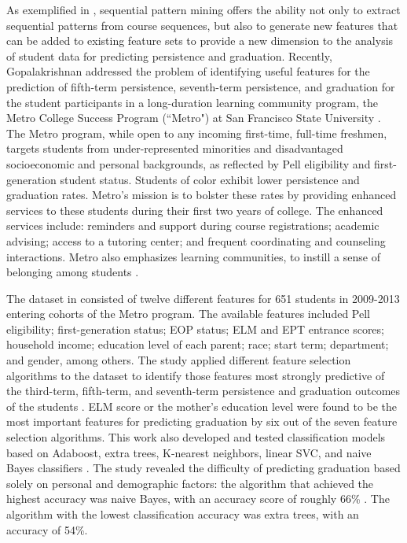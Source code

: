 As exemplified in \cite{Campagni}, sequential pattern mining offers the ability not only to extract sequential patterns from course sequences, but also to generate new features that can be added to existing feature sets to provide a new dimension to the analysis of student data for predicting persistence and graduation.  Recently, Gopalakrishnan \cite{Gopalakrishnan} addressed the problem of identifying useful features for the prediction of fifth-term persistence, seventh-term persistence, and graduation for the student participants in a long-duration learning community program, the Metro College Success Program (``Metro") at San Francisco State University \cite{Metro}.  The Metro program, while open to any incoming first-time, full-time freshmen, targets students from under-represented minorities and disadvantaged socioeconomic and personal backgrounds, as reflected by Pell eligibility and first-generation  student status.  Students of color exhibit lower persistence \cite{NCES_pers} and graduation \cite{NCES_grad} rates.  Metro's mission is to bolster these rates by providing enhanced services to these students during their first two years of college.  The enhanced services include: reminders and support during course registrations; academic advising; access to a tutoring center; and frequent coordinating and counseling interactions.  Metro also emphasizes learning communities, to instill a sense of belonging among students \cite{Tinto, Chen}.   

The dataset in \cite{Gopalakrishnan, Gopalakrishnan_thesis} consisted of twelve different features for 651 students in 2009-2013 entering cohorts of the Metro program.  The available features included Pell eligibility; first-generation status; EOP status; ELM and EPT entrance scores; household income; education level of each parent; race; start term; department; and gender, among others.  The study applied different feature selection algorithms to the dataset to identify those features most strongly predictive of the third-term, fifth-term, and seventh-term persistence and graduation outcomes of the students \cite[Table 3]{Gopalakrishnan}.  ELM score or the mother's education level were found to be the most important features for predicting graduation by six out of the seven feature selection algorithms.  This work also developed and tested classification models based on Adaboost, extra trees, K-nearest neighbors, linear SVC, and naive Bayes classifiers \cite{Gopalakrishnan_thesis}.  The study revealed the difficulty of predicting graduation based solely on personal and demographic factors: the algorithm that achieved the highest accuracy was naive Bayes, with an accuracy score of roughly 66\% \cite[Figure 16, top]{Gopalakrishnan_thesis}.  The algorithm with the lowest classification accuracy was extra trees, with an accuracy of 54\%.  

